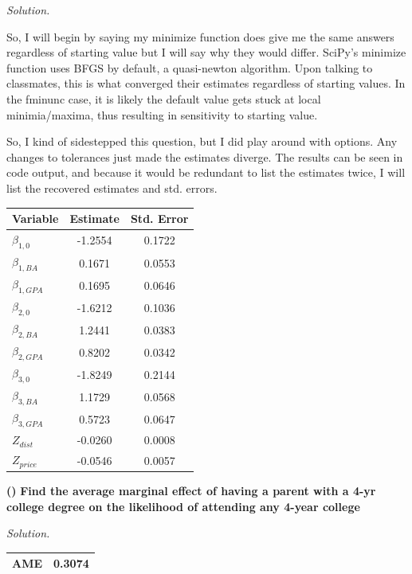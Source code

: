 \documentclass[11pt]{article}
\newcounter{q}
\newcounter{subq}[q]
\renewcommand{\thesubq}{\alph{subq}}
\newcommand{\subquestion}[1]{%
  \refstepcounter{subq}
  \vspace{0.35em}
  \noindent\textbf{(\thesubq)} \textbf{#1}\par
}
\newenvironment{solution}{%
  \vspace{0.15em}
  \noindent\textit{Solution. }\ignorespaces
}{\vspace{0.5em}\par}
\newcommand{\1}{\mathbf{1}}
\begin{document}
\begin{solution}
  So, I will begin by saying my minimize function does give me the same answers regardless of starting value but I will say why they would differ. SciPy's minimize function uses BFGS by default, a quasi-newton algorithm.
  Upon talking to classmates, this is what converged their estimates regardless of starting values. In the fminunc case, it is likely the default value gets stuck at local minimia/maxima, thus resulting in sensitivity to 
  starting value. 

  So, I kind of sidestepped this question, but I did play around with options. Any changes to tolerances just made the estimates diverge. The results can be seen in code output, and because it would be redundant to list the estimates twice, I will list the recovered estimates and std. errors.

  \begin{tabular}{lcc}
    \toprule
    Variable & Estimate & Std. Error \\
    \midrule 
    $\beta_{1,0}$ & -1.2554 & 0.1722 \\
    $\beta_{1,BA}$ & 0.1671 & 0.0553 \\
    $\beta_{1, GPA}$ & 0.1695 & 0.0646 \\
    $\beta_{2, 0}$ & -1.6212 & 0.1036 \\
    $\beta_{2, BA}$ & 1.2441 & 0.0383 \\
    $\beta_{2, GPA}$ & 0.8202 & 0.0342 \\
    $\beta_{3, 0}$ & -1.8249 & 0.2144 \\
    $\beta_{3, BA}$ & 1.1729 & 0.0568 \\
    $\beta_{3, GPA}$ & 0.5723 & 0.0647 \\
    \midrule
    $Z_{dist}$ & -0.0260 & 0.0008 \\
    $Z_{price}$ & -0.0546 & 0.0057 \\
    \bottomrule
  \end{tabular}
\end{solution}

\subquestion{Find the average marginal effect of having a parent with a 4-yr college degree on the likelihood
of attending any 4-year college}
\begin{solution}
  \begin{tabular}{lc}
    \toprule
    AME & 0.3074 \\
    \bottomrule
  \end{tabular}
\end{solution}
\end{document}
